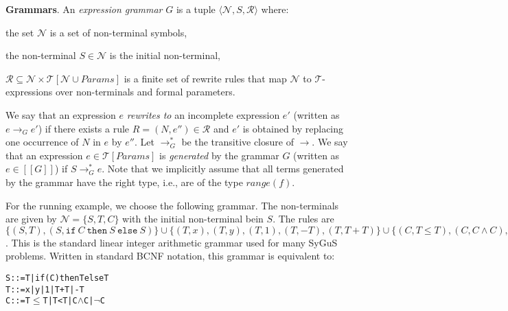 \documentclass{llncs}
\newcommand\tuple[1]{\langle #1 \rangle}
\newcommand\Expr{e}
\newcommand\Grammar{G}
\newcommand\sem[1]{[\![ #1 ]\!]}
\newcommand\SynthFun{f}
\newcommand\range{\mathit{range}}
\newcommand\FormalParameters{\mathit{Params}}
\newcommand\NonTerminals{\mathcal{N}}
\newcommand\NonTerminal{N}
\newcommand\StartSymbol{S}
\newcommand\Rules{\mathcal{R}}
\newcommand\Rule{R}
\newcommand\Theory{\mathcal{T}}
\newcommand\RewritesTo{\rightarrow}
\renewcommand{\paragraph}[1]{\par\noindent\textbf{#1}.}
\begin{document}
\paragraph{Grammars}
An {\em expression grammar} $\Grammar$ is a tuple $\tuple {
\NonTerminals, \StartSymbol, \Rules }$ where:
\begin{inparaenum}[(a)]
\item the set $\NonTerminals$ is a set of non-terminal symbols,
\item the non-terminal $\StartSymbol \in \NonTerminals$ is the initial non-terminal,
\item $\Rules \subseteq \NonTerminals \times
  \Theory[\NonTerminals \cup \FormalParameters]$ is a finite set
  of rewrite rules that map $\NonTerminals$ to $\Theory$-expressions
  over non-terminals and formal parameters.
\end{inparaenum}
We say that an expression $\Expr$ {\em rewrites to} an incomplete
expression $\Expr'$ (written as $\Expr \RewritesTo_\Grammar \Expr'$) if
there exists a rule $\Rule = (\NonTerminal, \Expr'') \in \Rules$ and
$\Expr'$ is obtained by replacing one occurrence of $\NonTerminal$ in
$\Expr$ by $\Expr''$.
Let $\RewritesTo_\Grammar^*$ be the transitive closure of $\RewritesTo$.
We say that an expression $\Expr \in \Theory[\FormalParameters]$
is {\em generated} by the grammar $\Grammar$ (written as $\Expr \in
\sem{\Grammar}$) if $\StartSymbol \RewritesTo_\Grammar^* \Expr$.
Note that we implicitly assume that all terms generated by the grammar
have the right type, i.e., are of the type $\range(\SynthFun)$.

\begin{example}
  \label{ex:running:grammar}
  For the running example, we choose the following grammar.
  The non-terminals are given by $\NonTerminals = \{ \StartSymbol, T, C \}$ with
  the initial non-terminal bein $\StartSymbol$.
  The rules are $\{ (\StartSymbol, T), (\StartSymbol,
        \mathtt{if}~C~\mathtt{then}~\StartSymbol~\mathtt{else}~\StartSymbol)
        \} \cup \{ (T, x), (T, y), (T, 1), (T, - T), (T, T + T) \} \cup
        \{ (C, T \leq T), (C, C \wedge C), (C, \neg C) \}$.
  This is the standard linear integer arithmetic grammar used for many
  SyGuS problems.
  Written in standard BCNF notation, this grammar is equivalent to:
    \vspace{-1ex}
  \begin{alltt}
    S ::= T | if (C) then T else T
    T ::= x | y | 1 | T + T | - T
    C ::= T \(\leq\) T | T < T | C \(\wedge\) C | \(\neg\) C
  \end{alltt}
    \vspace{-4ex}
\end{example}
\end{document}

